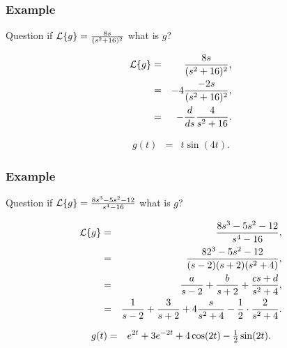 \begin{frame}
  \frametitle{Example}

  \begin{block}{Question}
    if $\laplace{g}=\frac{8s}{(s^2+16)^2}$ what is $g$?
  \end{block}

    {
      \begin{eqnarray*}
        \laplace{g} & = & \frac{8s}{(s^2+16)^2}, \\
        & = & -4 \frac{-2s}{(s^2+16)^2}, \\
        & = & - \frac{d}{ds} \frac{4}{s^2+16}.
      \end{eqnarray*}
    }

    {
      \begin{eqnarray*}
        g(t) & = & t \sin(4t).
      \end{eqnarray*}
    }
  

\end{frame}

\begin{frame}
  \frametitle{Example}

  \begin{block}{Question}
    if $\laplace{g}=\frac{8s^3-5s^2-12}{s^4-16}$ what is $g$?
  \end{block}

    {
      \begin{eqnarray*}
        \laplace{g} & = & \frac{8s^3-5s^2-12}{s^4-16}, \\
        & = & \frac{82^3-5s^2-12}{(s-2)(s+2)(s^2+4)}, \\
        & = & \frac{a}{s-2} + \frac{b}{s+2} + \frac{cs+d}{s^2+4}, \\
        & = & \frac{1}{s-2} + \frac{3}{s+2} + 4 \frac{s}{s^2+4} - \frac{1}{2}\cdot\frac{2}{s^2+4}.
      \end{eqnarray*}
    }

    {
      \begin{eqnarray*}
        g(t) & = & e^{2t} + 3e^{-2t} + 4\cos(2t) - \mbox{$\frac{1}{2}$}\sin(2t).
      \end{eqnarray*}
    }
  

\end{frame}




